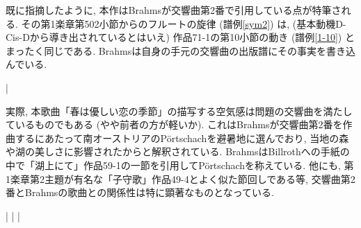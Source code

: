 既に指摘したように, 本作はBrahmsが交響曲第2番で引用している点が特筆される.
その第1楽章第502小節からのフルートの旋律 (譜例\ref{sym2}) は, (基本動機D-Cis-Dから導き出されているとはいえ)
作品71-1の第10小節の動き (譜例\ref{1-10}) とまったく同じである.
Brahmsは自身の手元の交響曲の出版譜にその事実を書き込んでいる.

\musicbegin
{}
\def\nbinstruments{1}%
\startextract%
\Notes{}\enotes
\NOtes{}\enotes
\Notes{}\enotes
\bar
\NOtes{}\qp\enotes
\endextract
{}

実際, 本歌曲「春は優しい恋の季節」の描写する空気感は問題の交響曲を満たしているものでもある (やや前者の方が軽いか).
これはBrahmsが交響曲第2番を作曲するにあたって南オーストリアのPörtschachを避暑地に選んでおり,
当地の森や湖の美しさに影響されたからと解釈されている.
BrahmsはBillrothへの手紙の中で「湖上にて」作品59-1の一節を引用してPörtschachを称えている.
他にも, 第1楽章第2主題が有名な「子守歌」作品49-4とよく似た節回しである等,
交響曲第2番とBrahmsの歌曲との関係性は特に顕著なものとなっている.

\musicbegin
	\def\nbinstruments{1}%
	\startextract%
	\NOtes{}\enotes
	\bar
	\NOtes{}\enotes
	\bar
	\NOtes{}\enotes
	\bar
	\NOtes{}\qp\enotes
	\zendextract
{}
